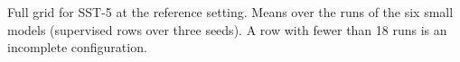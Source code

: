 \begin{table}[t]
  \centering
  \footnotesize
  
  \caption{Full grid for SST-5 at the reference setting. Means over the runs of the six small models (supervised rows over three seeds). A row with fewer than 18 runs is an incomplete configuration.}
  \label{tab:grid_sst}
\end{table}
